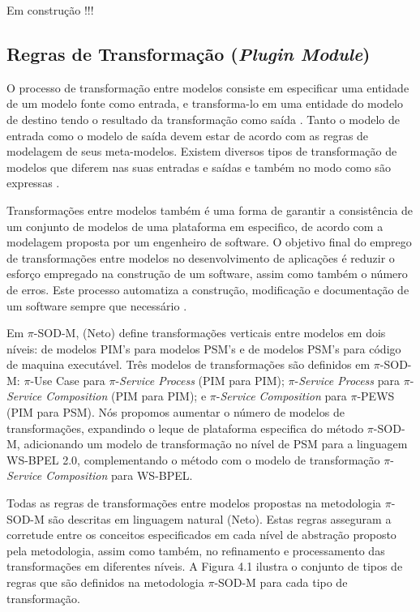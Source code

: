 Em construção !!!


\subsection{Regras de Transformação (\textit{Plugin Module})}%
\label{cndActivities}

O processo de transformação entre modelos consiste em especificar uma entidade de um modelo fonte como entrada, e transforma-lo em uma entidade do modelo de destino tendo o resultado da transformação como saída \cite{Placido}. Tanto o modelo de entrada como o modelo de saída devem estar de acordo com as regras de modelagem de seus meta-modelos.  Existem diversos tipos de transformação de modelos que diferem nas suas entradas e saídas e também no modo como são expressas \cite{miller2003}.

Transformações entre modelos também é uma forma de garantir a consistência de um conjunto de modelos de uma plataforma em especifico, de acordo com a modelagem proposta por um engenheiro de software. O objetivo final do emprego de transformações entre modelos no desenvolvimento de aplicações é reduzir o esforço empregado na construção de um software, assim como também o número de erros. Este processo automatiza a construção, modificação e documentação de um software sempre que necessário \cite{Jouault:2005:TMA}. 

Em $\pi$-SOD-M, (Neto) define transformações verticais entre modelos em dois níveis: de modelos PIM's para modelos PSM's e de modelos PSM's para código de maquina executável.  Três modelos de transformações são definidos em $\pi$-SOD-M: $\pi$-Use Case para $\pi$-\textit{Service Process} (PIM para PIM); $\pi$-\textit{Service Process} para $\pi$-\textit{Service Composition} (PIM para PIM); e $\pi$-\textit{Service Composition} para $\pi$-PEWS (PIM para PSM). Nós propomos aumentar o número de modelos de transformações, expandindo o leque de plataforma especifica do método $\pi$-SOD-M, adicionando um modelo de transformação no nível de PSM para a linguagem WS-BPEL 2.0, complementando o método com o modelo de transformação  $\pi$-\textit{Service Composition} para WS-BPEL.

Todas as regras de transformações entre modelos propostas na metodologia  $\pi$-SOD-M são descritas em linguagem natural (Neto). Estas regras asseguram a corretude entre os conceitos especificados em cada nível de abstração proposto pela metodologia, assim como também, no refinamento e processamento das transformações em diferentes níveis. A Figura 4.1 ilustra o conjunto de tipos de regras que são definidos na metodologia $\pi$-SOD-M para cada tipo de transformação. 

